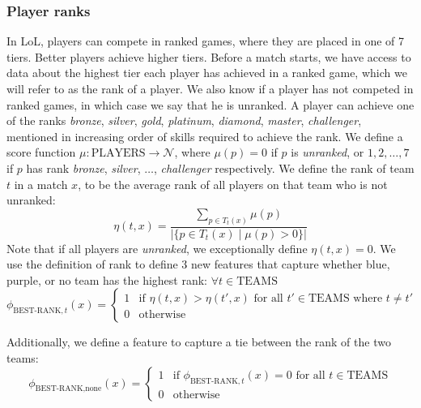 \subsubsection{Player ranks}
In LoL, players can compete in ranked games, where they are placed in one of 7 tiers. Better players achieve higher tiers.
Before a match starts, we have access to data about the highest tier each player has achieved in a ranked game, which we will refer to as the rank of a player. We also know if a player has not competed in ranked games, in which case we say that he is unranked.
A player can achieve one of the ranks \textit{bronze}, \textit{silver}, \textit{gold}, \textit{platinum}, \textit{diamond}, \textit{master}, \textit{challenger}, mentioned in increasing order of skills required to achieve the rank.
We define a score function $\mu : \text{PLAYERS} \rightarrow \mathcal{N}$, where $\mu(p) = 0$ if $p$ is \textit{unranked}, or $1, 2, \dots, 7$ if $p$ has rank \textit{bronze}, \textit{silver}, $\dots$, \textit{challenger} respectively.
We define the rank of team $t$ in a match $x$, to be the average rank of all players on that team who is not unranked:
\begin{equation}\label{eq:eta}
\eta(t, x) = \frac{\sum\limits_{p \in T_t(x)} \mu(p)}{|\{p \in T_t(x) \mid \mu(p) > 0\}|}
\end{equation}
Note that if all players are \textit{unranked}, we exceptionally define $\eta(t, x) = 0$. We use the definition of rank to define 3 new features that capture whether blue, purple, or no team has the highest rank:
$\forall t \in \text{TEAMS}$
\begin{equation}\label{eq:bestrank}
\phi_{\text{BEST-RANK},t}(x) = 
\begin{cases} 
  1 & \text{if } \eta(t,x) > \eta(t',x) \text{ for all } t' \in \text{TEAMS where } t \neq t'\\
  0 & \text{otherwise} 
\end{cases}  
\end{equation}

Additionally, we define a feature to capture a tie between the rank of the two teams:
\begin{equation}\label{eq:bestrank}
\phi_{\text{BEST-RANK},\text{none}}(x) = 
\begin{cases} 
  1 & \text{if } \phi_{\text{BEST-RANK},t}(x) = 0 \text{ for all } t \in \text{TEAMS}\\
  0 & \text{otherwise} 
\end{cases}  
\end{equation}

